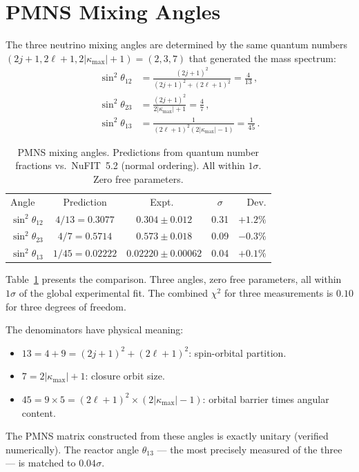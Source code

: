 \documentclass[aps,prd,twocolumn,superscriptaddress,nofootinbib,longbibliography]{revtex4-2}
\newcommand{\kmax}{|\kappa_{\mathrm{max}}|}
\begin{document}
\section{PMNS Mixing Angles}\label{sec:pmns}

The three neutrino mixing angles are determined by the same quantum
numbers $(2j+1, 2\ell+1, 2\kmax+1) = (2, 3, 7)$ that generated
the mass spectrum:
\begin{align}
  \sin^2\theta_{12} &= \frac{(2j+1)^2}{(2j+1)^2 + (2\ell+1)^2}
    = \frac{4}{13}\,, \label{eq:theta12}\\
  \sin^2\theta_{23} &= \frac{(2j+1)^2}{2\kmax + 1}
    = \frac{4}{7}\,, \label{eq:theta23}\\
  \sin^2\theta_{13} &= \frac{1}{(2\ell+1)^2(2\kmax - 1)}
    = \frac{1}{45}\,. \label{eq:theta13}
\end{align}

\begin{table}[t]
\caption{\label{tab:pmns}%
PMNS mixing angles.  Predictions from quantum number fractions
vs.\ NuFIT~5.2 (normal ordering).  All within $1\sigma$.  Zero free
parameters.}
\begin{ruledtabular}
\begin{tabular}{lcccr}
Angle & Prediction & Expt.\ & $\sigma$ & Dev. \\
\colrule
$\sin^2\theta_{12}$ & $4/13 = 0.3077$
  & $0.304 \pm 0.012$ & 0.31 & $+1.2\%$ \\
$\sin^2\theta_{23}$ & $4/7 = 0.5714$
  & $0.573 \pm 0.018$ & 0.09 & $-0.3\%$ \\
$\sin^2\theta_{13}$ & $1/45 = 0.02222$
  & $0.02220 \pm 0.00062$ & 0.04 & $+0.1\%$ \\
\end{tabular}
\end{ruledtabular}
\end{table}

Table~\ref{tab:pmns} presents the comparison.  Three angles, zero
free parameters, all within $1\sigma$ of the global experimental
fit.  The combined $\chi^2$ for three measurements is $0.10$ for
three degrees of freedom.

The denominators have physical meaning:
\begin{itemize}
\item $13 = 4 + 9 = (2j+1)^2 + (2\ell+1)^2$: spin-orbital partition.
\item $7 = 2\kmax + 1$: closure orbit size.
\item $45 = 9 \times 5 = (2\ell+1)^2 \times (2\kmax - 1)$: orbital
  barrier times angular content.
\end{itemize}
The PMNS matrix constructed from these angles is exactly unitary
(verified numerically).  The reactor angle $\theta_{13}$ --- the most
precisely measured of the three --- is matched to $0.04\sigma$.
\end{document}
